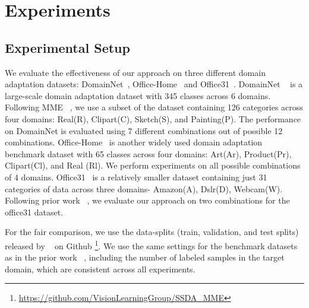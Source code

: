 \section{Experiments}
\label{sec:experiments}
\subsection{Experimental Setup}
We evaluate the effectiveness of our approach on three different domain adaptation datasets: DomainNet~\cite{peng2019moment}, Office-Home~\cite{Venkateswara2017DeepHN} and Office31~\cite{Saenko2010AdaptingVC}. DomainNet ~\cite{peng2019moment} is a large-scale domain adaptation dataset with 345 classes across 6 domains. Following MME ~\cite{Saito2019SemiSupervisedDA}, we use a subset of the dataset containing 126 categories across four domains: Real(R), Clipart(C), Sketch(S), and Painting(P). The performance on DomainNet is evaluated using 7 different combinations out of possible 12 combinations. Office-Home~\cite{Venkateswara2017DeepHN} is another widely used domain adaptation benchmark dataset with 65 classes across four domains: Art(Ar), Product(Pr), Clipart(Cl), and Real (Rl). We perform experiments on all possible combinations of 4 domains. Office31~\cite{Saenko2010AdaptingVC} is a relatively smaller dataset containing just 31 categories of data across three domains- Amazon(A), Dslr(D), Webcam(W). Following prior work ~\cite{Saito2019SemiSupervisedDA, Kim2020AttractPA}, we evaluate our approach on two combinations for the office31 dataset. 

For the fair comparison, we use the data-splits (train, validation, and test splits) released by ~\cite{Saito2019SemiSupervisedDA} on Github \footnote{\url{https://github.com/VisionLearningGroup/SSDA_MME}}. We use the same settings for the benchmark datasets as in the prior work ~\cite{Saito2019SemiSupervisedDA, Kim2020AttractPA}, including the number of labeled samples in the target domain, which are consistent across all experiments.

